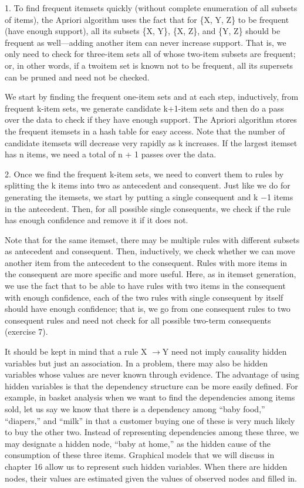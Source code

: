 1. To find frequent itemsets quickly (without complete enumeration of all subsets of items), the Apriori algorithm uses the fact that for \{X, Y, Z\} to be frequent (have enough support), all its subsets \{X, Y\}, \{X, Z\}, and \{Y, Z\} should be frequent as well---adding another item can never increase support. That is, we only need to check for three-item sets all of whose two-item subsets are frequent; or, in other words, if a twoitem set is known not to be frequent, all its supersets can be pruned and need not be checked.

We start by finding the frequent one-item sets and at each step, inductively, from frequent k-item sets, we generate candidate k+1-item sets and then do a pass over the data to check if they have enough support. The Apriori algorithm stores the frequent itemsets in a hash table for easy access. Note that the number of candidate itemsets will decrease very rapidly as k increases. If the largest itemset has n items, we need a total of n + 1 passes over the data.

2. Once we find the frequent k-item sets, we need to convert them to rules by splitting the k items into two as antecedent and consequent. Just like we do for generating the itemsets, we start by putting a single consequent and k $-$1 items in the antecedent. Then, for all possible single consequents, we check if the rule has enough confidence and remove it if it does not.

Note that for the same itemset, there may be multiple rules with different subsets as antecedent and consequent. Then, inductively, we check whether we can move another item from the antecedent to the consequent. Rules with more items in the consequent are more specific and more useful. Here, as in itemset generation, we use the fact that to be able to have rules with two items in the consequent with enough confidence, each of the two rules with single consequent by itself should have enough confidence; that is, we go from one consequent rules to two consequent rules and need not check for all possible two-term consequents (exercise 7).

It should be kept in mind that a rule X $\to$Y need not imply causality hidden variables but just an association. In a problem, there may also be hidden variables whose values are never known through evidence. The advantage of using hidden variables is that the dependency structure can be more easily defined. For example, in basket analysis when we want to find the dependencies among items sold, let us say we know that there is a dependency among “baby food,” “diapers,” and “milk” in that a customer buying one of these is very much likely to buy the other two. Instead of representing dependencies among these three, we may designate a hidden node, “baby at home,” as the hidden cause of the consumption of these three items. Graphical models that we will discuss in chapter 16 allow us to represent such hidden variables. When there are hidden nodes, their values are estimated given the values of observed nodes and filled in.

